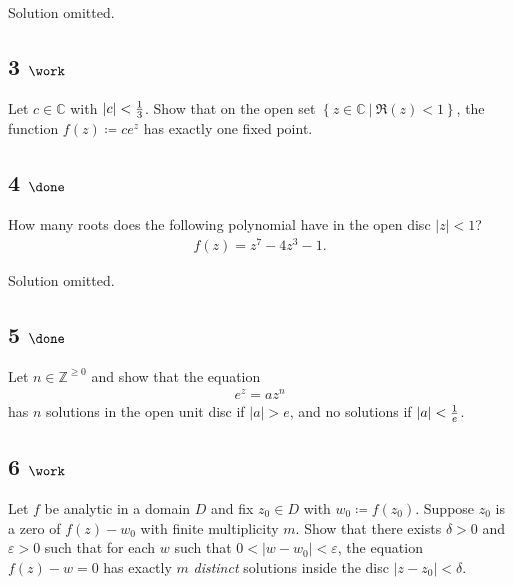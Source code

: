 Solution omitted.

\hypertarget{work-61}{%
\subsection{\texorpdfstring{3
\(\work\)}{3 \textbackslash work}}\label{work-61}}

Let \(c\in {\mathbb{C}}\) with
\({\left\lvert {c} \right\rvert} < {1\over 3}\). Show that on the open
set \(\left\{{z\in {\mathbb{C}}{~\mathrel{\Big|}~}\Re(z) < 1}\right\}\),
the function \(f(z) \coloneqq ce^z\) has exactly one fixed point.

\hypertarget{done-10}{%
\subsection{\texorpdfstring{4
\(\done\)}{4 \textbackslash done}}\label{done-10}}

How many roots does the following polynomial have in the open disc
\({\left\lvert {z} \right\rvert} < 1\)?
\begin{align*}
f(z) = z^7 - 4z^3 - 1
.\end{align*}

Solution omitted.

\hypertarget{done-11}{%
\subsection{\texorpdfstring{5
\(\done\)}{5 \textbackslash done}}\label{done-11}}

Let \(n\in {\mathbb{Z}}^{\geq 0}\) and show that the equation
\begin{align*}
e^z = az^n
\end{align*}
has \(n\) solutions in the open unit disc if
\({\left\lvert {a} \right\rvert} > e\), and no solutions if
\({\left\lvert {a} \right\rvert} < {1\over e}\).

\hypertarget{work-62}{%
\subsection{\texorpdfstring{6
\(\work\)}{6 \textbackslash work}}\label{work-62}}

Let \(f\) be analytic in a domain \(D\) and fix \(z_0 \in D\) with
\(w_0 \coloneqq f(z_0)\). Suppose \(z_0\) is a zero of \(f(z) - w_0\)
with finite multiplicity \(m\). Show that there exists \(\delta >0\) and
\(\varepsilon> 0\) such that for each \(w\) such that
\(0 < {\left\lvert {w-w_0} \right\rvert} < \varepsilon\), the equation
\(f(z) - w = 0\) has exactly \(m\) \emph{distinct} solutions inside the
disc \({\left\lvert {z-z_0} \right\rvert} < \delta\).

